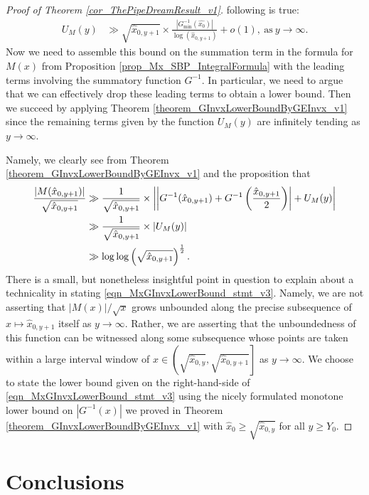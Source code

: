 \documentclass[11pt,reqno,a4letter]{article}
\numberwithin{figure}{section}
\numberwithin{table}{section}
\theoremstyle{plain}
\numberwithin{theorem}{section}
\theoremstyle{definition}
\begin{document}
\begin{proof}[Proof of Theorem \ref{cor_ThePipeDreamResult_v1}]
following is true: 
\begin{align*} 
U_M(y) & \gg \sqrt{\hat{x}_{0,y+1}} \times 
     \frac{|G_{\min}^{-1}(\hat{x_0})|}{\log(\hat{x}_{0,y+1})} 
     + o(1), \mathrm{\ as\ } y \rightarrow \infty. 
\end{align*} 
Now we need to assemble this bound on the summation term in the 
formula for $M(x)$ from 
Proposition \ref{prop_Mx_SBP_IntegralFormula} with the 
leading terms involving the summatory function $G^{-1}$. 
In particular, we need to argue that we can effectively drop these leading terms to 
obtain a lower bound. Then we succeed by applying 
Theorem \ref{theorem_GInvxLowerBoundByGEInvx_v1} since the remaining terms given by the 
function $U_M(y)$ are infinitely tending as $y \rightarrow \infty$. 

Namely, we clearly see from Theorem \ref{theorem_GInvxLowerBoundByGEInvx_v1} and the 
proposition that 
\begin{align} 
\notag 
\frac{|M(\hat{x}_{0,y+1})|}{\sqrt{\hat{x}_{0,y+1}}} & \gg \frac{1}{\sqrt{\hat{x}_{0,y+1}}} \times 
     \left\lvert \left\lvert 
     G^{-1}(\hat{x}_{0,y+1}) + G^{-1}\left(\frac{\hat{x}_{0,y+1}}{2}\right) \right\rvert + 
     U_M(y) \right\rvert \\ 
\notag 
     & \gg \frac{1}{\sqrt{\hat{x}_{0,y+1}}} \times \left\lvert U_M(y) \right\rvert \\ 
\label{eqn_MxGInvxLowerBound_stmt_v3} 
     & \gg \log\log\left(\sqrt{\hat{x}_{0,y+1}}\right)^{\frac{1}{2}}. 
\end{align} 
There is a small, but nonetheless insightful point in question 
to explain about a 
technicality in stating \eqref{eqn_MxGInvxLowerBound_stmt_v3}. 
Namely, we are not asserting that 
$|M(x)| / \sqrt{x}$ grows unbounded along the precise subsequence of 
$x \mapsto \hat{x}_{0,y+1}$ itself as $y \rightarrow \infty$. 
Rather, we are asserting that the unboundedness of this function 
can be witnessed along some subsequence whose points are taken within a 
large interval window of 
$x \in \left(\sqrt{\hat{x}_{0,y}}, \sqrt{\hat{x}_{0,y+1}}\right]$ as 
$y \rightarrow \infty$. 
We choose to state the lower bound given on the right-hand-side of 
\eqref{eqn_MxGInvxLowerBound_stmt_v3} using the nicely formulated 
monotone lower bound on $|G^{-1}(x)|$ we proved in 
Theorem \ref{theorem_GInvxLowerBoundByGEInvx_v1} 
with $\hat{x}_0 \geq \sqrt{\hat{x}_{0,y}}$ for all $y \geq Y_0$. 
\end{proof} 

\newpage 
\section{Conclusions} 
\end{document}

